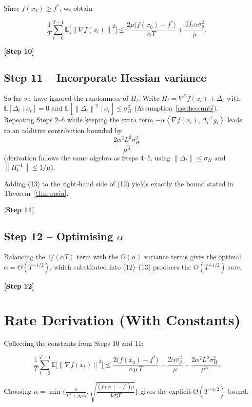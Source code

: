 \documentclass{article}
\newcommand{\E}{\mathbb{E}}
\newcommand{\norm}[1]{\left\|#1\right\|}
\newcommand{\inner}[2]{\left\langle #1,#2\right\rangle}
\newcommand{\grad}{\nabla}
\newcommand{\hess}{\nabla^{2}}
\begin{document}
Since $f(x_{T})\ge f^{*}$, we obtain

\[
\frac{1}{T}\sum_{t=0}^{T-1}\E\!\big[\norm{\grad f(x_{t})}^{2}\big]
\le\frac{2\mu\big(f(x_{0})-f^{*}\big)}{\alpha T}
   +\frac{2L\alpha\sigma_{g}^{2}}{\mu}. \tag{12}
\]

\noindent\textbf{[Step 10]}

\subsection*{Step 11 – Incorporate Hessian variance}
So far we have ignored the randomness of $H_{t}$.  
Write $H_{t}= \hess f(x_{t})+\Delta_{t}$ with $\E[\Delta_{t}\mid x_{t}]=0$ and
$\E[\norm{\Delta_{t}}^{2}\mid x_{t}]\le\sigma_{H}^{2}$ (Assumption~\ref{ass:hessunb}).  
Repeating Steps 2–6 while keeping the extra term
$-\alpha\inner{\grad f(x_{t})}{\Delta_{t}^{-1}g_{t}}$ leads to an additive
contribution bounded by
\[
\frac{2\alpha^{2}L^{2}\sigma_{H}^{2}}{\mu^{3}} \tag{13}
\]
(derivation follows the same algebra as Steps 4–5, using $\norm{\Delta_{t}}\le\sigma_{H}$ and $\norm{H_{t}^{-1}}\le1/\mu$).  

Adding (13) to the right‑hand side of (12) yields exactly the bound stated in Theorem~\ref{thm:main}.

\noindent\textbf{[Step 11]}

\subsection*{Step 12 – Optimising $\alpha$}
Balancing the $1/(\alpha T)$ term with the $O(\alpha)$ variance terms gives the optimal
$\alpha= \Theta(T^{-1/2})$, which substituted into (12)–(13) produces the $O(T^{-1/2})$ rate.

\noindent\textbf{[Step 12]}

\section*{Rate Derivation (With Constants)}
Collecting the constants from Steps 10 and 11:

\[
\boxed{
\frac{1}{T}\sum_{t=0}^{T-1}\E\!\big[\norm{\grad f(x_{t})}^{2}\big]
\le
\frac{2\big(f(x_{0})-f^{*}\big)}{\alpha\mu\,T}
+
\frac{2\alpha\sigma_{g}^{2}}{\mu}
+
\frac{2\alpha^{2}L^{2}\sigma_{H}^{2}}{\mu^{3}} } .
\]

Choosing $\alpha = \min\!\Big\{\frac{\mu}{L^{2}+\mu\rho R},
\sqrt{\frac{(f(x_{0})-f^{*})\mu}{L\sigma_{g}^{2}T}}\Big\}$ gives the explicit $O(T^{-1/2})$ bound.
\end{document}
